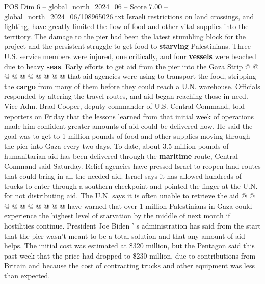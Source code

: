 \begin{textsample}{POS Dim 6 – global\_north\_2024\_06 – Score 7.00 – global\_north\_2024\_06/108965026.txt}
Israeli restrictions on land crossings, and fighting, have greatly limited the flow of food and other vital supplies into the territory.
The damage to the pier had been the latest stumbling block for the project and the persistent struggle to get food to \textbf{starving} Palestinians.
Three U.S. service members were injured, one critically, and four \textbf{vessels} were beached due to heavy \textbf{seas}.
Early efforts to get aid from the pier into the Gaza Strip @ @ @ @ @ @ @ @ @ @ that aid agencies were using to transport the food, stripping the \textbf{cargo} from many of them before they could reach a U.N. warehouse.
Officials responded by altering the travel routes, and aid began reaching those in need.
Vice Adm.
Brad Cooper, deputy commander of U.S.
Central Command, told reporters on Friday that the lessons learned from that initial week of operations made him confident greater amounts of aid could be delivered now.
He said the goal was to get to 1 million pounds of food and other supplies moving through the pier into Gaza every two days.
To date, about 3.5 million pounds of humanitarian aid has been delivered through the \textbf{maritime} route, Central Command said Saturday.
Relief agencies have pressed Israel to reopen land routes that could bring in all the needed aid.
Israel says it has allowed hundreds of trucks to enter through a southern checkpoint and pointed the finger at the U.N. for not distributing aid.
The U.N. says it is often unable to retrieve the aid @ @ @ @ @ @ @ @ @ @ have warned that over 1 million Palestinians in Gaza could experience the highest level of starvation by the middle of next month if hostilities continue.
President Joe Biden ' s administration has said from the start that the pier wasn't meant to be a total solution and that any amount of aid helps.
The initial cost was estimated at \$320 million, but the Pentagon said this past week that the price had dropped to \$230 million, due to contributions from Britain and because the cost of contracting trucks and other equipment was less than expected.

\end{textsample}
